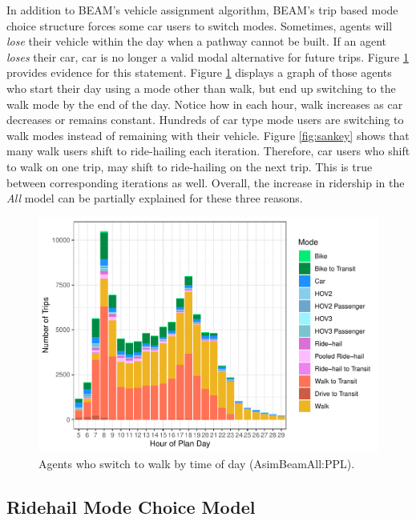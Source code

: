 \documentclass[fancy, masters]{byuthesis}
\begin{document}
In addition to BEAM's vehicle assignment algorithm, BEAM's trip based mode choice structure forces some car users to switch modes. Sometimes, agents will \emph{lose} their vehicle within the day when a pathway cannot be built. If an agent \emph{loses} their car, car is no longer a valid modal alternative for future trips. Figure \ref{fig:walkers} provides evidence for this statement. Figure \ref{fig:walkers} displays a graph of those agents who start their day using a mode other than walk, but end up switching to the walk mode by the end of the day. Notice how in each hour, walk increases as car decreases or remains constant. Hundreds of car type mode users are switching to walk modes instead of remaining with their vehicle. Figure \ref{fig:sankey} shows that many walk users shift to ride-hailing each iteration. Therefore, car users who shift to walk on one trip, may shift to ride-hailing on the next trip. This is true between corresponding iterations as well. Overall, the increase in ridership in the \emph{All} model can be partially explained for these three reasons.

\begin{figure}

{\centering \includegraphics{thesis_files/figure-latex/walkers-1} 

}

\caption{Agents who switch to walk by time of day (AsimBeamAll:PPL).}\label{fig:walkers}
\end{figure}

\hypertarget{type2}{%
\subsection{Ridehail Mode Choice Model}\label{type2}}
\end{document}
